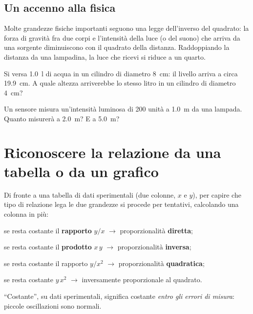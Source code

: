 \subsection{Un accenno alla fisica}
Molte grandezze fisiche importanti seguono una legge dell'inverso del quadrato: la forza di gravità fra due corpi e l'intensità della luce (o del suono) che arriva da una sorgente diminuiscono con il quadrato della distanza. Raddoppiando la distanza da una lampadina, la luce che ricevi si riduce a un quarto.

\begin{esercizio}
Si versa \SI{1,0}{\litre} di acqua in un cilindro di diametro \SI{8}{\centi\metre}: il livello arriva a circa \SI{19,9}{\centi\metre}. A quale altezza arriverebbe lo stesso litro in un cilindro di diametro \SI{4}{\centi\metre}?\\
\end{esercizio}

\begin{esercizio}
Un sensore misura un'intensità luminosa di \SI{200}{} unità a \SI{1,0}{\metre} da una lampada. Quanto misurerà a \SI{2,0}{\metre}? E a \SI{5,0}{\metre}?\\
\end{esercizio}

\section[Riconoscere la relazione]{Riconoscere la relazione da una tabella o da un grafico}\label{sec:riconoscere}

Di fronte a una tabella di dati sperimentali (due colonne, $x$ e $y$), per capire che tipo di relazione lega le due grandezze si procede per tentativi, calcolando una colonna in più:
\begin{elenco}
    \item se resta costante il \textbf{rapporto} $y/x$ \; $\to$ \; proporzionalità \textbf{diretta};
    \item se resta costante il \textbf{prodotto} $x\,y$ \; $\to$ \; proporzionalità \textbf{inversa};
    \item se resta costante il rapporto $y/x^2$ \; $\to$ \; proporzionalità \textbf{quadratica};
    \item se resta costante $y\,x^2$ \; $\to$ \; inversamente proporzionale al quadrato.
\end{elenco}
``Costante'', su dati sperimentali, significa costante \emph{entro gli errori di misura}: piccole oscillazioni sono normali.

